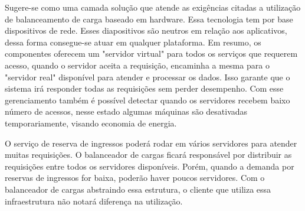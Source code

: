 Sugere-se como uma camada solução que atende as exigências citadas a utilização de balanceamento de carga baseado 
em hardware.
Essa tecnologia tem por base dispositivos de rede. Esses diapositivos são neutros em relação aos aplicativos, dessa forma
consegue-se atuar em qualquer plataforma. Em resumo, os componentes oferecem um "servidor virtual" para todos os serviços
que requerem acesso, quando o servidor aceita a requisição, encaminha a mesma para o "servidor real" disponível para atender
e processar os dados.
Isso garante que o sistema irá responder todas as requisições sem perder desempenho.
Com esse gerenciamento também é possível detectar quando os servidores recebem baixo número de acessos, nesse
estado algumas máquinas são desativadas temporariamente, visando economia de energia.

O serviço de reserva de ingressos poderá rodar em vários servidores para atender muitas requisições.
O balanceador de cargas ficará responsável por distribuir as requisições entre todos os servidores disponíveis.
Porém, quando a demanda por reservas de ingressos for baixa, poderão haver poucos servidores.
Com o balanceador de cargas abstraindo essa estrutura, o cliente que utiliza essa infraestrutura
não notará diferença na utilização.
